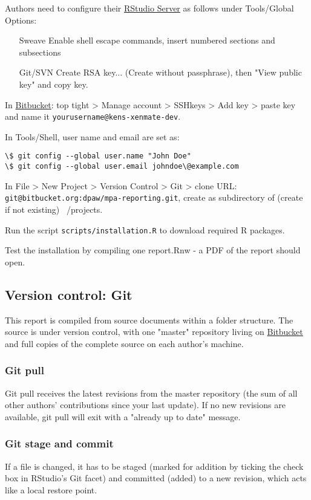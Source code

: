 Authors need to configure their \href{https://rstudio.dpaw.wa.gov.au/}{RStudio Server}
as follows under Tools/Global Options:

\begin{itemize}
	\item[Sweave] Enable shell escape commands, insert numbered sections and subsections
	\item[Git/SVN] Create RSA key... (Create without passphrase), then "View public key" and copy key.
\end{itemize}

In \href{https://bitbucket.org/}{Bitbucket}: top tight > Manage account > SSHkeys >
Add key > paste key and name it \texttt{yourusername@kens-xenmate-dev}.

In Tools/Shell, user name and email are set as:
\begin{verbatim}
\$ git config --global user.name "John Doe"
\$ git config --global user.email johndoe\@example.com
\end{verbatim}

In File > New Project > Version Control > Git > clone URL: \\
\texttt{git@bitbucket.org:dpaw/mpa-reporting.git},
create as subdirectory of (create if not existing) ~/projects.

Run the script \texttt{scripts/installation.R} to download required R packages.

Test the installation by compiling one report.Rnw - a PDF of the report should open.

\subsection*{Version control: Git}
This report is compiled from source documents within a folder structure.
The source is under version control, with one "master" repository living on
\href{https://bitbucket.org/dpaw/mpa-reporting/}{Bitbucket} and full copies of
the complete source on each author's machine.

\subsubsection*{Git pull}
Git pull receives the latest revisions from the master repository (the sum of all other authors'
contributions since your last update). If no new revisions are available, git pull will exit
with a "already up to date" message.

\subsubsection*{Git stage and commit}
If a file is changed, it has to be staged (marked for addition by ticking the check box in
RStudio's Git facet) and committed (added) to a new revision, which acts like a local restore point.

